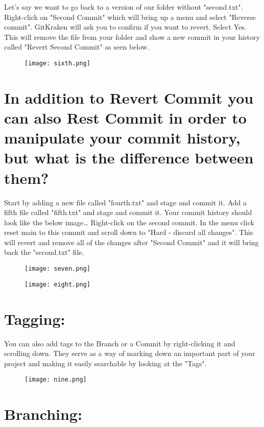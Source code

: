 \documentclass[10pt,twocolumn]{article}
\begin{document}
Let's say we want to go back to a version of our folder without "second.txt". Right-click on "Second Commit" which will bring up a menu and select "Reverse commit". GitKraken will ask you to confirm if you want to revert. Select Yes. This will remove the file from your folder and show a new commit in your history called "Revert Second Commit" as seen below.

\begin{figure}[htbp]
\centering
\texttt{[image: sixth.png]}
\label{fig:my_label}
\end{figure}

\section{In addition to Revert Commit you can also Rest Commit in order to manipulate your commit history, but what is the difference between them?}

Start by adding a new file called "fourth.txt" and stage and commit it. Add a fifth file called "fifth.txt" and stage and commit it. Your commit history should look like the below image… Right-click on the second commit. In the menu click reset main to this commit and scroll down to "Hard - discard all changes". This will revert and remove all of the changes after "Second Commit" and it will bring back the "second.txt" file.
\begin{figure}[htbp]
\centering
\texttt{[image: seven.png]}
\label{fig:my_label}
\end{figure}
\begin{figure}[htbp]
\centering
\texttt{[image: eight.png]}
\label{fig:my_label}
\end{figure}

\section{Tagging:}

You can also add tags to the Branch or a Commit by right-clicking it and scrolling down. They serve as a way of marking down an important part of your project and making it easily searchable by looking at the "Tags".

\begin{figure}[htbp]
\centering
\texttt{[image: nine.png]}
\label{fig:my_label}
\end{figure}

\section{Branching:}
\end{document}
